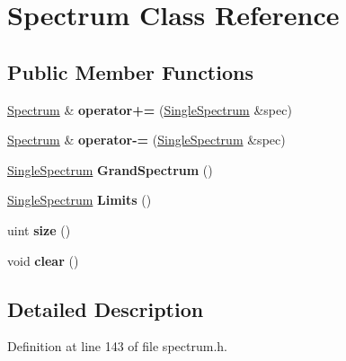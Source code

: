 \hypertarget{class_spectrum}{}\section{Spectrum Class Reference}
\label{class_spectrum}
\subsection*{Public Member Functions}
\begin{DoxyCompactItemize}
\item 
\hyperlink{class_spectrum}{Spectrum} \& {\bfseries operator+=} (\hyperlink{class_single_spectrum}{Single\+Spectrum} \&spec)\hypertarget{class_spectrum_ac30c829d8ae1bdde1a0ea0e6cef87a4d}{}\label{class_spectrum_ac30c829d8ae1bdde1a0ea0e6cef87a4d}

\item 
\hyperlink{class_spectrum}{Spectrum} \& {\bfseries operator-\/=} (\hyperlink{class_single_spectrum}{Single\+Spectrum} \&spec)\hypertarget{class_spectrum_a811119db4a9a80559d48e4515a6459b8}{}\label{class_spectrum_a811119db4a9a80559d48e4515a6459b8}

\item 
\hyperlink{class_single_spectrum}{Single\+Spectrum} {\bfseries Grand\+Spectrum} ()\hypertarget{class_spectrum_a041b82b8cc88be4f8d701aa3fac066e6}{}\label{class_spectrum_a041b82b8cc88be4f8d701aa3fac066e6}

\item 
\hyperlink{class_single_spectrum}{Single\+Spectrum} {\bfseries Limits} ()\hypertarget{class_spectrum_a14abc191ca8f12552a54b6bb09567fb5}{}\label{class_spectrum_a14abc191ca8f12552a54b6bb09567fb5}

\item 
uint {\bfseries size} ()\hypertarget{class_spectrum_a9640391cdb12174df3e816f4cc74adec}{}\label{class_spectrum_a9640391cdb12174df3e816f4cc74adec}

\item 
void {\bfseries clear} ()\hypertarget{class_spectrum_ad62a0ee86cfe3eb5a0c29069174a5129}{}\label{class_spectrum_ad62a0ee86cfe3eb5a0c29069174a5129}

\end{DoxyCompactItemize}


\subsection{Detailed Description}


Definition at line 143 of file spectrum.\+h.

